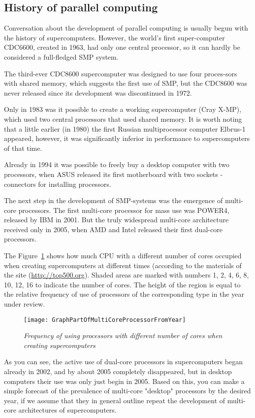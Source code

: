 { %
	\subsection{History of parallel computing}
	\par Conversation about the development of parallel computing is usually begun with the history of supercomputers. However, the world's first super-computer CDC6600, created in 1963, had only one central processor, so it can hardly be considered a full-fledged SMP system.
	\par The third-ever CDC8600 supercomputer was designed to use four proces-sors with shared memory, which suggests the first use of SMP, but the CDC8600 was never released since its development was discontinued in 1972.
	\par Only in 1983 was it possible to create a working supercomputer (Cray X-MP), which used two central processors that used shared memory. It is worth noting that a little earlier (in 1980) the first Russian multiprocessor computer Elbrus-1 appeared, however, it was significantly inferior in performance to supercomputers of that time.
	\par Already in 1994 it was possible to freely buy a desktop computer with two processors, when ASUS released its first motherboard with two sockets - connectors for installing processors.
	\par The next step in the development of SMP-systems was the emergence of multi-core processors. The first multi-core processor for mass use was POWER4, released by IBM in 2001. But the truly widespread multi-core architecture received only in 2005, when AMD and Intel released their first dual-core processors.
	\par The Figure~\ref{GraphPartOfMultiCoreProcessorFromYear:image} shows how much CPU with a different number of cores occupied when creating supercomputers at different times (according to the materials of the site (\url{http://top500.org}). Shaded areas are marked with numbers 1, 2, 4, 6, 8, 10, 12, 16 to indicate the number of cores. The height of the region is equal to the relative frequency of use of processors of the corresponding type in the year under review.
	\begin{figure}[H]
		\texttt{[image: GraphPartOfMultiCoreProcessorFromYear]}
		\caption{\textit{Frequency of using processors with different number of cores when creating supercomputers}}
		\label{GraphPartOfMultiCoreProcessorFromYear:image}
	\end{figure}
	\par As you can see, the active use of dual-core processors in supercomputers began already in 2002, and by about 2005 completely disappeared, but in desktop computers their use was only just begin in 2005. Based on this, you can make a simple forecast of the prevalence of multi-core "desktop"  processors by the desired year, if we assume that they in general outline repeat the development of multi-core architectures of supercomputers.
	\par
}